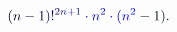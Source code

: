 \documentclass[12pt]{article}
\begin{document}
\makeatletter
\renewcommand*{\@textcolor}[3]{%
  \protect\leavevmode
  \begingroup
    \color#1{#2}#3%
  \endgroup
}
\makeatother
\begin{displaymath}
\mathcolor[RGB]{0,0,15}{(} \mathcolor[RGB]{0,0,30}{n} \mathcolor[RGB]{0,0,45}{-} \mathcolor[RGB]{0,0,60}{1} \mathcolor[RGB]{0,0,75}{)} \mathcolor[RGB]{0,0,90}{!} ^ { \mathcolor[RGB]{0,0,105}{2} \mathcolor[RGB]{0,0,120}{n} \mathcolor[RGB]{0,0,135}{+} \mathcolor[RGB]{0,0,150}{1} } \mathcolor[RGB]{0,0,165}{\cdot} \mathcolor[RGB]{0,0,180}{n} ^ { \mathcolor[RGB]{0,0,195}{2} } \mathcolor[RGB]{0,0,210}{\cdot} \mathcolor[RGB]{0,0,225}{(} \mathcolor[RGB]{0,0,240}{n} ^ { \mathcolor[RGB]{0,0,255}{2} } \mathcolor[RGB]{0,15,0}{-} \mathcolor[RGB]{0,15,15}{1} \mathcolor[RGB]{0,15,30}{)} \mathcolor[RGB]{0,15,45}{.}
\end{displaymath}
\end{document}
